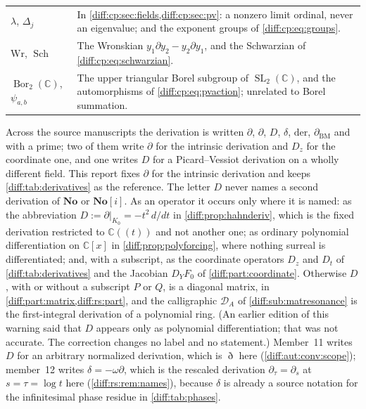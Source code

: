 \documentclass[11pt,letterpaper]{article}
\numberwithin{equation}{section}
\theoremstyle{definition}
\theoremstyle{remark}
\newcommand{\No}{\mathbf{No}}
\newcommand{\SC}{\mathbf{No}[i]}
\newcommand{\C}{\mathbb C}
\newcommand{\der}{\partial}
\newcommand{\SL}{\operatorname{SL}}
\newcommand{\Sch}{\operatorname{Sch}}
\newcommand{\Bor}{\operatorname{Bor}}
\newcommand{\derT}{\der_{\tau}}
\newcommand{\Dn}{\eth}
\begin{document}
\begin{longtable}{@{}L{0.17\textwidth}L{0.76\textwidth}@{}}
$\lambda$, $\Delta_{j}$ & In \cref{diff:cp:sec:fields,diff:cp:sec:pv}: a nonzero limit
ordinal, never an eigenvalue; and the exponent groups of
\cref{diff:cp:eq:groups}. \\
$\mathrm{Wr}$, $\Sch$ & The Wronskian $y_{1}\der y_{2}-y_{2}\der y_{1}$, and the
Schwarzian of \cref{diff:cp:eq:schwarzian}. \\
$\Bor_{2}(\C)$, $\psi_{a,b}$ & The upper triangular Borel subgroup of
$\SL_{2}(\C)$, and the automorphisms of \cref{diff:cp:eq:pvaction}; unrelated to
Borel summation. \\
\bottomrule
\end{longtable}

\begin{warning}
\label{diff:warn:concordance}
Across the source manuscripts the derivation is written $\der$, $\partial$,
$D$, $\delta$, $\mathrm{der}$, $\partial_{\mathrm{BM}}$ and with a prime; two
of them write $\partial$ for the intrinsic derivation and $D_{z}$ for the
coordinate one, and one writes $D$ for a Picard--Vessiot derivation on a
wholly different field. This report fixes $\der$ for the intrinsic derivation
and keeps \cref{diff:tab:derivatives} as the reference. The letter $D$ never
names a second derivation of $\No$ or $\SC$. As an operator it occurs only where
it is named: as the abbreviation $D:=\der|_{K_{0}}=-t^{2}\,d/dt$ in
\cref{diff:prop:hahnderiv}, which is the fixed derivation restricted to
$\C((t))$ and not another one; as ordinary polynomial differentiation on
$\C[x]$ in \cref{diff:prop:polyforcing}, where nothing surreal is
differentiated; and, with a subscript, as the coordinate operators $D_{z}$ and
$D_{t}$ of \cref{diff:tab:derivatives} and the Jacobian $D_{Y}F_{0}$ of
\cref{diff:part:coordinate}. Otherwise $D$, with or without a subscript $P$ or
$Q$, is a diagonal matrix, in \cref{diff:part:matrix,diff:rs:part}, and the
calligraphic $\mathcal D_{A}$ of \cref{diff:sub:matresonance} is the
first-integral derivation of a polynomial ring. (An earlier edition of this
warning said that $D$ appears only as polynomial differentiation; that was not
accurate. The correction changes no label and no statement.) Member~11 writes
$D$ for an arbitrary normalized derivation, which is $\Dn$ here
(\cref{diff:aut:conv:scope}); member~12 writes $\delta=-\omega\der$, which is the
rescaled derivation $\derT=\der_{s}$ at $s=\tau=\log t$ here
(\cref{diff:rs:rem:names}), because $\delta$ is already a source notation for the
infinitesimal phase residue in \cref{diff:tab:phases}.


\end{warning}
\end{document}
